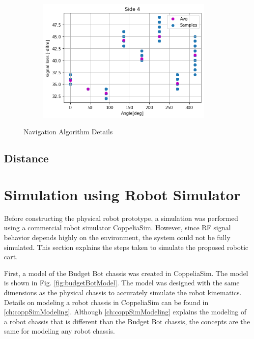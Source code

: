 \begin{figure}[H]
\begin{subfigure}{0.50\textwidth}
        \label{fig:Side3Dat}
    \end{subfigure}%
    \begin{subfigure}{0.50\textwidth}
        \centering
        \includegraphics[width=0.95\textwidth]{figs/img/Side4_Data.png}
        \label{fig:Side4Dat}
    \end{subfigure}
    \caption{Navigation Algorithm Details}
    \label{fig:SensorDataGraphs}
\end{figure}

\subsection{Distance}




\section{Simulation using Robot Simulator}

Before constructing the physical robot prototype, a simulation was performed using a commercial robot simulator CoppeliaSim. However, since RF signal behavior depends highly on the environment, the system could not be fully simulated. This section explains the steps taken to simulate the proposed robotic cart.

\vspace*{12pt}
\noindent
First, a model of the Budget Bot chassis was created in CoppeliaSim. The model is shown in Fig. \ref{fig:budgetBotModel}. The model was designed with the same dimensions as the physical chassis to accurately simulate the robot kinematics. Details on modeling a robot chassis in CoppeliaSim can be found in \autoref{ch:coppSimModeling}. Although \autoref{ch:coppSimModeling} explains the modeling of a robot chassis that is different than the Budget Bot chassis, the concepts are the same for modeling any robot chassis.

